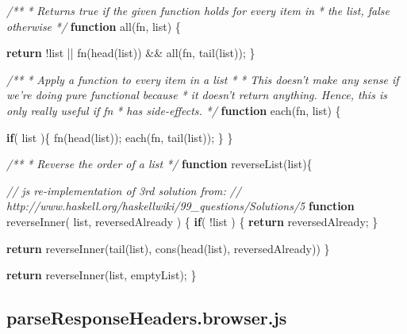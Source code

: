 \documentclass[12pt, ]{article}
\newenvironment{Shaded}{}{}
\newcommand{\KeywordTok}[1]{\textcolor[rgb]{0.00,0.44,0.13}{\textbf{{#1}}}}
\newcommand{\CommentTok}[1]{\textcolor[rgb]{0.38,0.63,0.69}{\textit{{#1}}}}
\newcommand{\FunctionTok}[1]{\textcolor[rgb]{0.02,0.16,0.49}{{#1}}}
\newcommand{\NormalTok}[1]{{#1}}
\begin{document}
\begin{Shaded}
\begin{Highlighting}[]
\CommentTok{/** }
\CommentTok{ * Returns true if the given function holds for every item in }
\CommentTok{ * the list, false otherwise }
\CommentTok{ */}
\KeywordTok{function} \FunctionTok{all}\NormalTok{(fn, list) \{}
   
   \KeywordTok{return} \NormalTok{!list || }
          \FunctionTok{fn}\NormalTok{(}\FunctionTok{head}\NormalTok{(list)) && }\FunctionTok{all}\NormalTok{(fn, }\FunctionTok{tail}\NormalTok{(list));}
\NormalTok{\}}

\CommentTok{/**}
\CommentTok{ * Apply a function to every item in a list}
\CommentTok{ * }
\CommentTok{ * This doesn't make any sense if we're doing pure functional because }
\CommentTok{ * it doesn't return anything. Hence, this is only really useful if fn }
\CommentTok{ * has side-effects. }
\CommentTok{ */}
\KeywordTok{function} \FunctionTok{each}\NormalTok{(fn, list) \{}

   \KeywordTok{if}\NormalTok{( list )\{  }
      \FunctionTok{fn}\NormalTok{(}\FunctionTok{head}\NormalTok{(list));}
      \FunctionTok{each}\NormalTok{(fn, }\FunctionTok{tail}\NormalTok{(list));}
   \NormalTok{\}}
\NormalTok{\}}

\CommentTok{/**}
\CommentTok{ * Reverse the order of a list}
\CommentTok{ */}
\KeywordTok{function} \FunctionTok{reverseList}\NormalTok{(list)\{ }

   \CommentTok{// js re-implementation of 3rd solution from:}
   \CommentTok{//    http://www.haskell.org/haskellwiki/99_questions/Solutions/5}
   \KeywordTok{function} \FunctionTok{reverseInner}\NormalTok{( list, reversedAlready ) \{}
      \KeywordTok{if}\NormalTok{( !list ) \{}
         \KeywordTok{return} \NormalTok{reversedAlready;}
      \NormalTok{\}}
      
      \KeywordTok{return} \FunctionTok{reverseInner}\NormalTok{(}\FunctionTok{tail}\NormalTok{(list), }\FunctionTok{cons}\NormalTok{(}\FunctionTok{head}\NormalTok{(list), reversedAlready))}
   \NormalTok{\}}

   \KeywordTok{return} \FunctionTok{reverseInner}\NormalTok{(list, emptyList);}
\NormalTok{\}}
\end{Highlighting}
\end{Shaded}

\pagebreak

\subsection{parseResponseHeaders.browser.js}\label{headerux5fparseResponseHeaders.browser}
\end{document}
